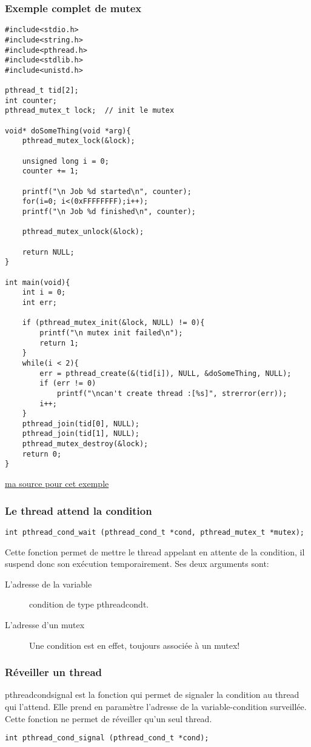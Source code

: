 \documentclass[a4paper]{article}
\begin{document}
\subsubsection{Exemple complet de mutex}
\begin{lstlisting}
#include<stdio.h>
#include<string.h>
#include<pthread.h>
#include<stdlib.h>
#include<unistd.h>

pthread_t tid[2];
int counter;
pthread_mutex_t lock;  // init le mutex

void* doSomeThing(void *arg){
    pthread_mutex_lock(&lock);

    unsigned long i = 0;
    counter += 1;

    printf("\n Job %d started\n", counter);
    for(i=0; i<(0xFFFFFFFF);i++);
    printf("\n Job %d finished\n", counter);

    pthread_mutex_unlock(&lock);

    return NULL;
}

int main(void){
    int i = 0;
    int err;

    if (pthread_mutex_init(&lock, NULL) != 0){
        printf("\n mutex init failed\n");
        return 1;
    }
    while(i < 2){
        err = pthread_create(&(tid[i]), NULL, &doSomeThing, NULL);
        if (err != 0)
            printf("\ncan't create thread :[%s]", strerror(err));
        i++;
    }
    pthread_join(tid[0], NULL);
    pthread_join(tid[1], NULL);
    pthread_mutex_destroy(&lock);
    return 0;
}
\end{lstlisting}
\href{https://www.thegeekstuff.com/2012/05/c-mutex-examples/}{ma source pour cet exemple}
\newpage
\subsubsection{Le thread attend la condition}
\begin{lstlisting}
int pthread_cond_wait (pthread_cond_t *cond, pthread_mutex_t *mutex);
\end{lstlisting}
Cette fonction permet de mettre le thread appelant en attente de la condition, il suspend donc son exécution temporairement.
Ses deux arguments sont:
\begin{description}
  \item [L'adresse de la variable] condition de type pthread\textunderscore{}cond\textunderscore{}t.
  \item [L'adresse d'un mutex] Une condition est en effet, toujours associée à un mutex!
\end{description}
\subsubsection{Réveiller un thread}
pthread\textunderscore{}cond\textunderscore{}signal est la fonction qui permet de signaler la condition au thread qui l'attend.
Elle prend en paramètre l'adresse de la variable-condition surveillée. Cette fonction ne permet de réveiller qu'un seul thread.
\begin{lstlisting}
int pthread_cond_signal (pthread_cond_t *cond);
\end{lstlisting}
\end{document}
